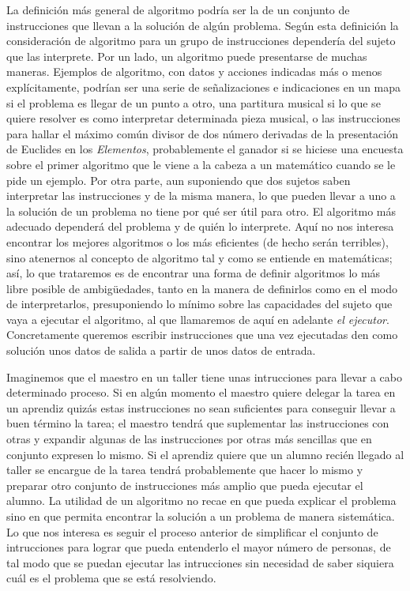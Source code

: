%
La definición más general de algoritmo podría ser la de un conjunto de instrucciones que llevan a la
solución de algún problema. Según esta definición la consideración de algoritmo para un grupo de
instrucciones dependería del sujeto que las interprete. Por un lado, un algoritmo puede presentarse
de muchas maneras. Ejemplos de algoritmo, con datos y acciones indicadas más o menos explícitamente,
podrían ser una serie de señalizaciones e indicaciones en un mapa si el problema es llegar de un
punto a otro, una partitura musical si lo que se quiere resolver es como interpretar determinada
pieza musical, o las instrucciones para hallar el máximo común divisor de dos número derivadas de la
presentación de Euclides en los {\it Elementos}, probablemente el ganador si se hiciese una encuesta
sobre el primer algoritmo que le viene a la cabeza a un matemático cuando se le pide un ejemplo. Por
otra parte, aun suponiendo que dos sujetos saben interpretar las instrucciones y de la misma manera,
lo que pueden llevar a uno a la solución de un problema no tiene por qué ser útil para otro. El
algoritmo más adecuado dependerá del problema y de quién lo interprete. Aquí no nos interesa
encontrar los mejores algoritmos o los más eficientes (de hecho serán terribles), sino atenernos al
concepto de algoritmo tal y como se entiende en matemáticas; así, lo que trataremos es de encontrar
una forma de definir algoritmos lo más libre posible de ambigüedades, tanto en la manera de
definirlos como en el modo de interpretarlos, presuponiendo lo mínimo sobre las capacidades del
sujeto que vaya a ejecutar el algoritmo, al que llamaremos de aquí en adelante {\it el
ejecutor}. Concretamente queremos escribir instrucciones que una vez ejecutadas den como solución
unos datos de salida a partir de unos datos de entrada.

%
Imaginemos que el maestro en un taller tiene unas intrucciones para llevar a cabo determinado
proceso. Si en algún momento el maestro quiere delegar la tarea en un aprendiz quizás estas
instrucciones no sean suficientes para conseguir llevar a buen término la tarea; el maestro tendrá
que suplementar las instrucciones con otras y expandir algunas de las instrucciones por otras más
sencillas que en conjunto expresen lo mismo. Si el aprendiz quiere que un alumno recién llegado al
taller se encargue de la tarea tendrá probablemente que hacer lo mismo y preparar otro conjunto de
instrucciones más amplio que pueda ejecutar el alumno. La utilidad de un algoritmo no recae en que
pueda explicar el problema sino en que permita encontrar la solución a un problema de manera
sistemática. Lo que nos interesa es seguir el proceso anterior de simplificar el conjunto de
intrucciones para lograr que pueda entenderlo el mayor número de personas, de tal modo que se puedan
ejecutar las intrucciones sin necesidad de saber siquiera cuál es el problema que se está
resolviendo.

